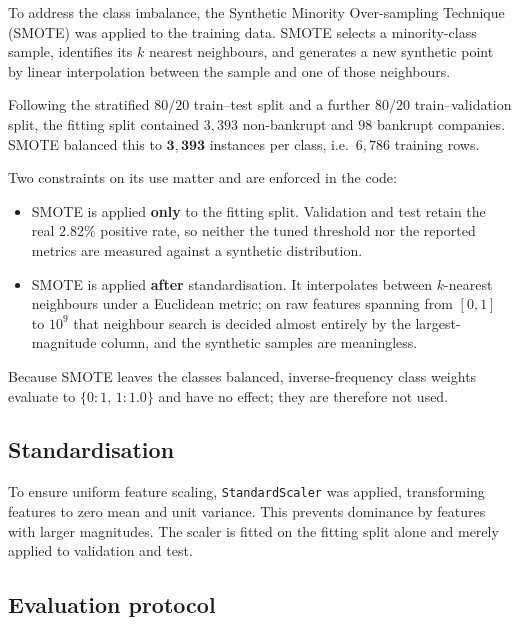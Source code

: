 \documentclass[11pt]{article}
\begin{document}
To address the class imbalance, the Synthetic Minority Over-sampling Technique
(SMOTE) was applied to the training data. SMOTE selects a minority-class
sample, identifies its $k$ nearest neighbours, and generates a new synthetic
point by linear interpolation between the sample and one of those neighbours.

Following the stratified $80/20$ train--test split and a further $80/20$
train--validation split, the fitting split contained $3{,}393$ non-bankrupt and
$98$ bankrupt companies. SMOTE balanced this to $\mathbf{3{,}393}$ instances per
class, i.e.\ $6{,}786$ training rows.

Two constraints on its use matter and are enforced in the code:

\begin{itemize}[nosep, leftmargin=1.4em]
    \item SMOTE is applied \textbf{only} to the fitting split. Validation and
          test retain the real $2.82\%$ positive rate, so neither the tuned
          threshold nor the reported metrics are measured against a synthetic
          distribution.
    \item SMOTE is applied \textbf{after} standardisation. It interpolates
          between $k$-nearest neighbours under a Euclidean metric; on raw
          features spanning from $[0,1]$ to $10^{9}$ that neighbour search is
          decided almost entirely by the largest-magnitude column, and the
          synthetic samples are meaningless.
\end{itemize}

Because SMOTE leaves the classes balanced, inverse-frequency class weights
evaluate to $\{0\!:\!1,\, 1\!:\!1.0\}$ and have no effect; they are therefore
not used.

\subsection{Standardisation}

To ensure uniform feature scaling, \texttt{StandardScaler} was applied,
transforming features to zero mean and unit variance. This prevents dominance
by features with larger magnitudes. The scaler is fitted on the fitting split
alone and merely applied to validation and test.

\subsection{Evaluation protocol}
\label{sec:protocol}
\end{document}

